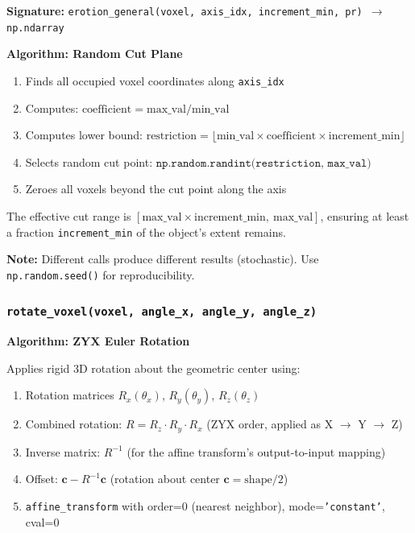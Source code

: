 \documentclass[12pt,a4paper]{article}
\begin{document}
\textbf{Signature:} \texttt{erotion\_general(voxel, axis\_idx, increment\_min, pr) $\rightarrow$ np.ndarray}

\textbf{Algorithm: Random Cut Plane}

\begin{enumerate}
  \item Finds all occupied voxel coordinates along \texttt{axis\_idx}
  \item Computes: $\text{coefficient} = \text{max\_val} / \text{min\_val}$
  \item Computes lower bound: $\text{restriction} = \lfloor \text{min\_val} \times \text{coefficient} \times \text{increment\_min} \rfloor$
  \item Selects random cut point: $\texttt{np.random.randint(restriction, max\_val)}$
  \item Zeroes all voxels beyond the cut point along the axis
\end{enumerate}

The effective cut range is $[\text{max\_val} \times \text{increment\_min},\ \text{max\_val}]$, ensuring at least a fraction \texttt{increment\_min} of the object's extent remains.

\textbf{Note:} Different calls produce different results (stochastic). Use \texttt{np.random.seed()} for reproducibility.

\subsubsection{\texttt{rotate\_voxel(voxel, angle\_x, angle\_y, angle\_z)}}

\textbf{Algorithm: ZYX Euler Rotation}

Applies rigid 3D rotation about the geometric center using:
\begin{enumerate}
  \item Rotation matrices $R_x(\theta_x)$, $R_y(\theta_y)$, $R_z(\theta_z)$
  \item Combined rotation: $R = R_z \cdot R_y \cdot R_x$ (ZYX order, applied as X $\rightarrow$ Y $\rightarrow$ Z)
  \item Inverse matrix: $R^{-1}$ (for the affine transform's output-to-input mapping)
  \item Offset: $\mathbf{c} - R^{-1}\mathbf{c}$ (rotation about center $\mathbf{c} = \text{shape}/2$)
  \item \texttt{affine\_transform} with order=0 (nearest neighbor), mode=\texttt{'constant'}, cval=0
\end{enumerate}
\end{document}
